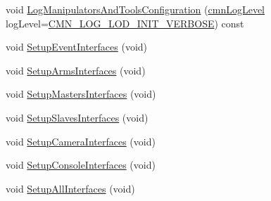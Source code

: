 \begin{DoxyCompactItemize}
\item 
void \hyperlink{classmts_intuitive_da_vinci_a82c5afa2ac835b951fbd9bccdece5e7d}{Log\-Manipulators\-And\-Tools\-Configuration} (\hyperlink{cmn_log_lo_d_8h_a70c67165c37a0971e0dd1a85d4edaaae}{cmn\-Log\-Level} log\-Level=\hyperlink{cmn_log_lo_d_8h_a019ecc9e1487050d540772de22800f44}{C\-M\-N\-\_\-\-L\-O\-G\-\_\-\-L\-O\-D\-\_\-\-I\-N\-I\-T\-\_\-\-V\-E\-R\-B\-O\-S\-E}) const 
\end{DoxyCompactItemize}
{\bf }\par
\begin{DoxyCompactItemize}
\item 
void \hyperlink{classmts_intuitive_da_vinci_a054e0b8026c6b3dd5687a4fee483e90c}{Setup\-Event\-Interfaces} (void)
\item 
void \hyperlink{classmts_intuitive_da_vinci_a8aeffb95c89efb86cd572f44017f7ae7}{Setup\-Arms\-Interfaces} (void)
\item 
void \hyperlink{classmts_intuitive_da_vinci_acb63524cb2eb5b30b43316ab5afe03af}{Setup\-Masters\-Interfaces} (void)
\item 
void \hyperlink{classmts_intuitive_da_vinci_acf772730a5e12199341cbf1a369e7fb9}{Setup\-Slaves\-Interfaces} (void)
\item 
void \hyperlink{classmts_intuitive_da_vinci_ad9912a22c4eea6d1bac867728e0c492f}{Setup\-Camera\-Interfaces} (void)
\item 
void \hyperlink{classmts_intuitive_da_vinci_a5481bd6861ce379fa3d81a2c71812d89}{Setup\-Console\-Interfaces} (void)
\item 
void \hyperlink{classmts_intuitive_da_vinci_ac2945537490e01f890dd3496c21129ab}{Setup\-All\-Interfaces} (void)
\end{DoxyCompactItemize}

